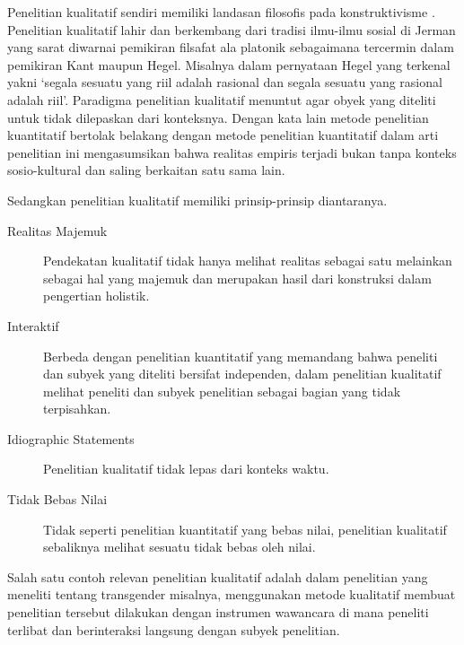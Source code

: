 \begin{solution}
	Penelitian kualitatif sendiri memiliki landasan filosofis pada konstruktivisme \cite{ginting_filsafat_2008,mertens_research_2015}.
	Penelitian kualitatif lahir dan berkembang dari tradisi ilmu-ilmu sosial di Jerman yang sarat diwarnai pemikiran filsafat ala platonik sebagaimana tercermin dalam pemikiran Kant maupun Hegel.
	Misalnya dalam pernyataan Hegel yang terkenal yakni `segala sesuatu yang riil adalah rasional dan segala sesuatu yang rasional adalah riil'. Paradigma penelitian kualitatif menuntut agar obyek yang diteliti untuk tidak dilepaskan dari konteksnya.
	Dengan kata lain metode penelitian kuantitatif bertolak belakang dengan metode penelitian kuantitatif dalam arti penelitian ini mengasumsikan bahwa realitas empiris terjadi bukan tanpa konteks sosio-kultural dan saling berkaitan satu sama lain.
	
	Sedangkan penelitian kualitatif memiliki prinsip-prinsip diantaranya.
	\begin{description}
		\item[Realitas Majemuk] Pendekatan kualitatif tidak hanya melihat realitas sebagai satu melainkan sebagai hal yang majemuk dan merupakan hasil dari konstruksi dalam pengertian holistik.
		\item[Interaktif] Berbeda dengan penelitian kuantitatif yang memandang bahwa peneliti dan subyek yang diteliti bersifat independen, dalam penelitian kualitatif melihat peneliti dan subyek penelitian sebagai bagian yang tidak terpisahkan.
		\item[Idiographic Statements] Penelitian kualitatif tidak lepas dari konteks waktu.
		\item[Tidak Bebas Nilai] Tidak seperti penelitian kuantitatif yang bebas nilai, penelitian kualitatif sebaliknya melihat sesuatu tidak bebas oleh nilai.
	\end{description}
	
	Salah satu contoh relevan penelitian kualitatif adalah dalam penelitian yang meneliti tentang transgender misalnya, menggunakan metode kualitatif membuat penelitian tersebut dilakukan dengan instrumen wawancara di mana peneliti terlibat dan berinteraksi langsung dengan subyek penelitian.
	
\end{solution}
